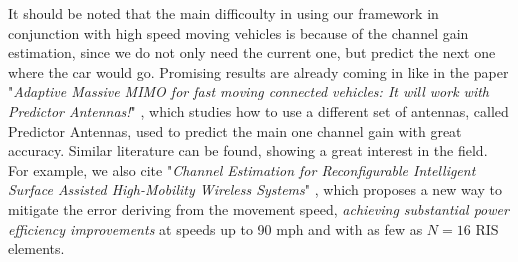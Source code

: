 It should be noted that the main difficoulty in using our framework in conjunction with high speed moving vehicles is because of the channel gain estimation, since we do not only need the current one, but predict the next one where the car would go. Promising results are already coming in like in the paper "\textit{Adaptive Massive MIMO for fast moving connected vehicles: It will work with Predictor Antennas!}" \cite{8385489}, which studies how to use a different set of antennas, called Predictor Antennas, used to predict the main one channel gain with great accuracy. Similar literature can be found, showing a great interest in the field. For example, we also cite "\textit{Channel Estimation for Reconfigurable Intelligent Surface Assisted High-Mobility Wireless Systems}" \cite{9875062}, which proposes a new way to mitigate the error deriving from the movement speed, \textit{achieving substantial power efficiency improvements} at speeds up to 90 mph and with as few as $N=16$ RIS elements.